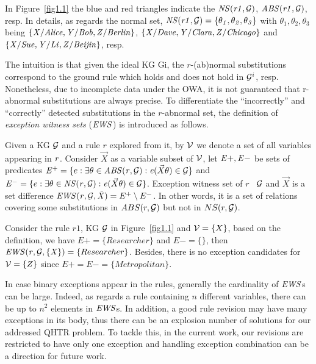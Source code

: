 \begin{example}\label{ex:abns}
In Figure~\ref{fig1.1} the blue and red triangles indicate the $\mathit{NS(r1,\mathcal{G})}$, $\mathit{ABS(r1,\mathcal{G})}$, resp. In details, as regards the normal set, $\mathit{NS(r1,\mathcal{G})}=\{\mathit{\theta_1,\theta_2,\theta_3}\}$ with $\theta_1,\theta_2,\theta_3$ being $\{\mathit{X/Alice,Y/Bob,Z/Berlin}\}$, $\{\mathit{X/Dave,Y/Clara,Z/Chicago}\}$ and $\{\mathit{X/Sue,Y/Li,Z/Beijin}\}$, resp.
\end{example}

The intuition is that given the ideal KG Gi, the $r$-(ab)normal substitutions correspond to the ground rule which holds and does not hold in $\mathcal{G}^i$, resp. Nonetheless, due to incomplete data under the OWA, it is not guaranteed that r-abnormal substitutions are always precise. To differentiate the ``incorrectly'' and ``correctly'' detected substitutions in the $r$-abnormal set, the definition of \emph{exception witness sets} ($\mathit{EWS}$) is introduced as follows.

\begin{definition} \label{def:ews}
Given a KG $\mathcal{G}$ and a rule $r$ explored from it, by $\mathcal{V}$ we denote a set of all variables appearing in $\mathit{r}$. Consider $\vec{X}$ as a variable subset of $\mathcal{V}$, let $\mathit{E+, E-}$ be sets of predicates $\mathit{E^+}=\{e: \exists \theta \in \mathit{ABS(r,\mathcal{G})}: \mathit{e}(\vec{X}\theta)\in \mathcal{G}\}$ and $\mathit{E^-}=\{e: \exists \theta \in \mathit{NS(r,\mathcal{G})}: \mathit{e}(\vec{X}\theta)\in \mathcal{G}\}$. Exception witness set of $r$ \wrt\ $\mathcal{G}$ and $\vec{X}$ is a set difference $\mathit{EWS(r,\mathcal{G},\vec{X})}=E^+ \setminus E^-$. In other words, it is a set of relations covering some substitutions in $ABS(r, \mathcal{G})$ but not in $NS(r, \mathcal{G})$.
\end{definition}

\begin{example}
Consider the rule $r1$, KG $\mathcal{G}$ in Figure~\ref{fig1.1} and $\mathcal{V} = \{X\}$, based on the definition, we have $E+ = \{Researcher\}$ and $E- = \{\}$, then $\mathit{EWS(r,\mathcal{G},\{X\})}=\{Researcher\}$. Besides, there is no exception candidates for $\mathcal{V} = \{Z\}$ since $E+ = E- = \{Metropolitan\}$.
\end{example}

In case binary exceptions appear in the rules, generally the cardinality of $\mathit{EWS}$s can be large. Indeed, as regards a rule containing $n$ different variables, there can be up to $n^2$ elements in $\mathit{EWS}$s. In addition, a good rule revision may have many exceptions in its body, thus there can be an explosion number of solutions for our addressed QHTR problem. To tackle this, in the current work, our revisions are restricted to have only one exception and handling exception combination can be a direction for future work.

